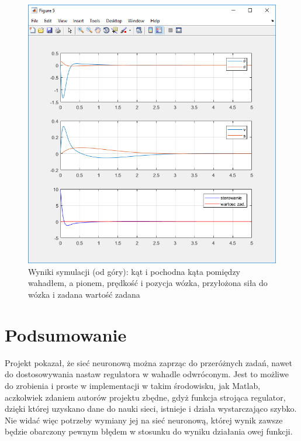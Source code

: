 \documentclass[10pt,a4paper,titlepage]{article}
\begin{document}
	\begin{figure}[H]
		\center
		\includegraphics[width=\textwidth]{wyniksymulacji2.png}
		\caption{Wyniki symulacji (od góry): kąt i pochodna kąta pomiędzy wahadłem, a pionem, prędkość i pozycja wózka, przyłożona siła do wózka i zadana wartość zadana}
	\end{figure}
	
	\section{Podsumowanie}
	Projekt pokazał, że sieć neuronową można zaprząc do przeróżnych zadań, nawet do dostosowywania nastaw regulatora w wahadle odwróconym. Jest to możliwe do zrobienia i proste w implementacji w takim środowisku, jak Matlab, aczkolwiek zdaniem autorów projektu zbędne, gdyż funkcja strojąca regulator, dzięki której uzyskano dane do nauki sieci, istnieje i działa wystarczająco szybko. Nie widać więc potrzeby wymiany jej na sieć neuronową, której wynik zawsze będzie obarczony pewnym błędem w stosunku do wyniku działania owej funkcji.
	
\end{document}
